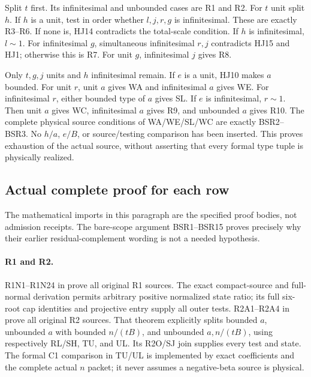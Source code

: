 Split \(t\) first.  Its infinitesimal and unbounded
cases are R1 and R2.
For \(t\) unit split \(h\).
If \(h\) is a unit, test in order whether \(l,j,r,g\)
is infinitesimal.  These are exactly R3--R6.
If none is, HJ14 contradicts the total-scale
condition.
If \(h\) is infinitesimal, \(l\sim1\).
For infinitesimal \(g\), simultaneous infinitesimal
\(r,j\) contradicts HJ15 and HJ1; otherwise this
is R7.
For unit \(g\), infinitesimal \(j\) gives R8.

Only \(t,g,j\) units and \(h\) infinitesimal remain.
If \(e\) is a unit, HJ10 makes \(a\) bounded.
For unit \(r\), unit \(a\) gives WA and infinitesimal
\(a\) gives WE.  For infinitesimal \(r\), either
bounded type of \(a\) gives SL.
If \(e\) is infinitesimal, \(r\sim1\).
Then unit \(a\) gives WC, infinitesimal \(a\) gives
R9, and unbounded \(a\) gives R10.
The complete physical source conditions of
WA/WE/SL/WC are exactly BSR2--BSR3.
No \(h/a\), \(e/B\), or source/testing comparison
has been inserted.  This proves exhaustion of
the actual source, without asserting that every
formal type tuple is physically realized.

\subsection{Actual complete proof for each row}

The mathematical imports in this paragraph are the
specified proof bodies, not admission receipts.
The bare-scope argument BSR1--BSR15 proves precisely
why their earlier residual-complement wording is
not a needed hypothesis.

\paragraph{R1 and R2.}
R1N1--R1N24 in
prove all original R1 sources.
The exact compact-source and full-normal derivation
permits arbitrary positive normalized state ratio;
its full six-root cap identities and projective
entry supply all outer tests.
R2A1--R2A4 in
prove all original R2 sources.
That theorem explicitly splits bounded \(a\),
unbounded \(a\) with bounded \(n/(tB)\), and
unbounded \(a,n/(tB)\), using respectively
RL/SH, TU, and UL.
Its R2O/SJ join supplies every test and state.
The formal C1 comparison in TU/UL is implemented
by exact coefficients and the complete actual
\(n\) packet; it never assumes a negative-beta
source is physical.

